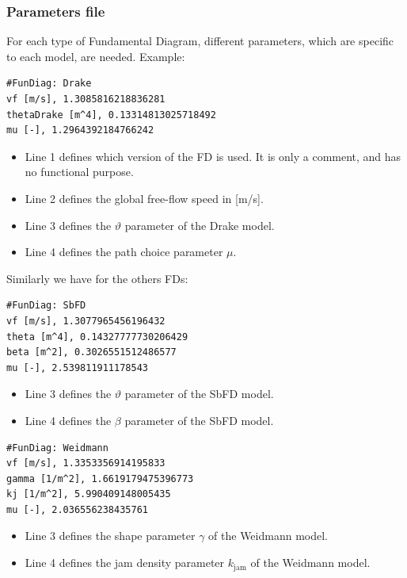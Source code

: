 \documentclass[a4paper,12pt]{article}
\begin{document}
\subsubsection{Parameters file}
For each type of Fundamental Diagram, different parameters, which are specific to each model, are needed.
\newline\newline
Example: 

\begin{lstlisting}[breaklines]
#FunDiag: Drake
vf [m/s], 1.3085816218836281
thetaDrake [m^4], 0.13314813025718492
mu [-], 1.2964392184766242
\end{lstlisting}

\begin{itemize}
\item Line 1 defines which version of the FD is used. It is only a comment, and has no functional purpose.
\item Line 2 defines the global free-flow speed in [m/s].
\item Line 3 defines the $\vartheta$ parameter of the Drake model.
\item Line 4 defines the path choice parameter $\mu$.
\end{itemize}
Similarly we have for the others FDs: 

\begin{lstlisting}[breaklines]
#FunDiag: SbFD
vf [m/s], 1.3077965456196432
theta [m^4], 0.14327777730206429
beta [m^2], 0.3026551512486577
mu [-], 2.539811911178543
\end{lstlisting}

\begin{itemize}
\item Line 3 defines the $\vartheta$ parameter of the SbFD model.
\item Line 4 defines the $\beta$ parameter of the SbFD model. 
\end{itemize}

\begin{lstlisting}[breaklines]
#FunDiag: Weidmann
vf [m/s], 1.3353356914195833
gamma [1/m^2], 1.6619179475396773
kj [1/m^2], 5.990409148005435
mu [-], 2.036556238435761
\end{lstlisting}

\begin{itemize}
\item Line 3 defines the shape parameter $\gamma$ of the Weidmann model.
\item Line 4 defines the jam density parameter $k_\text{jam}$ of the Weidmann model. 
\end{itemize}
\end{document}
